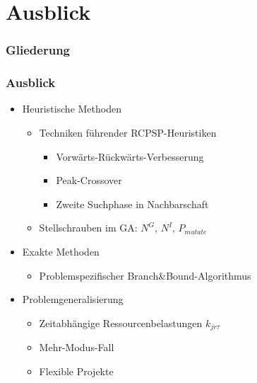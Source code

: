 \section{Ausblick}

\begin{frame}
\frametitle{Gliederung}
\end{frame}

\begin{frame}
\frametitle{Ausblick}
\begin{itemize}
\item Heuristische Methoden
	\begin{itemize}
	\item Techniken führender RCPSP-Heuristiken
		\begin{itemize}
		\item Vorwärts-Rückwärts-Verbesserung
		\item Peak-Crossover
		\item Zweite Suchphase in Nachbarschaft
		\end{itemize}
	\item Stellschrauben im GA: $N^G$, $N^I$, $P_{mutate}$\\[4mm]
	\end{itemize}
	
\item Exakte Methoden
	\begin{itemize}\item Problemspezifischer Branch\&Bound-Algorithmus\\[4mm]\end{itemize}
	
\item Problemgeneralisierung
	\begin{itemize}
	\item Zeitabhängige Ressourcenbelastungen $k_{jr\tau}$
	\item Mehr-Modus-Fall
	\item Flexible Projekte
	\end{itemize}
\end{itemize}
\end{frame}




